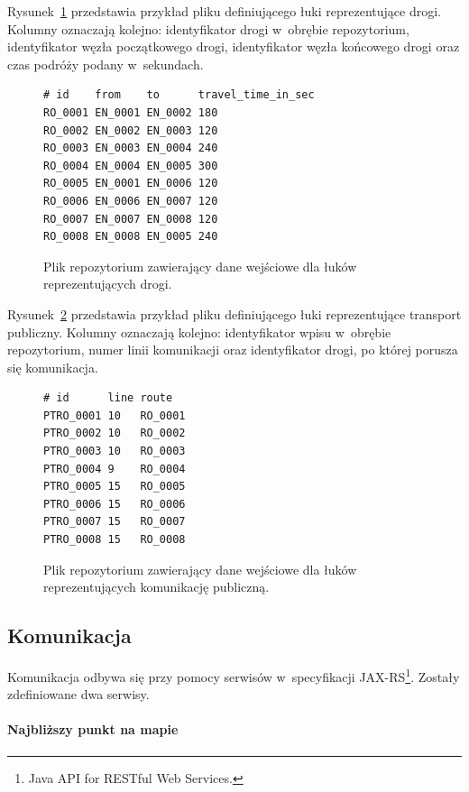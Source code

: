 \documentclass[a4paper,12pt]{article}
\begin{document}
	Rysunek~\ref{vrb:routes_repository} przedstawia przykład pliku definiującego łuki reprezentujące drogi. Kolumny oznaczają kolejno: identyfikator drogi w~obrębie repozytorium, identyfikator węzła początkowego drogi, identyfikator węzła końcowego drogi oraz czas podróży podany w~sekundach.

	\begin{figure}[ht!]
		\centering
		\begin{BVerbatim}
# id    from    to      travel_time_in_sec
RO_0001 EN_0001 EN_0002 180
RO_0002 EN_0002 EN_0003 120
RO_0003 EN_0003 EN_0004 240
RO_0004 EN_0004 EN_0005 300
RO_0005 EN_0001 EN_0006 120
RO_0006 EN_0006 EN_0007 120
RO_0007 EN_0007 EN_0008 120
RO_0008 EN_0008 EN_0005 240
		\end{BVerbatim}
		\caption{Plik repozytorium zawierający dane wejściowe dla łuków reprezentujących drogi.}
		\label{vrb:routes_repository}
	\end{figure}

	Rysunek~\ref{vrb:ptroutes_repository} przedstawia przykład pliku definiującego łuki reprezentujące transport publiczny. Kolumny oznaczają kolejno: identyfikator wpisu w~obrębie repozytorium, numer linii komunikacji oraz identyfikator drogi, po której porusza się komunikacja.

	\begin{figure}[ht!]
		\centering
		\begin{BVerbatim}
# id      line route
PTRO_0001 10   RO_0001
PTRO_0002 10   RO_0002
PTRO_0003 10   RO_0003
PTRO_0004 9    RO_0004
PTRO_0005 15   RO_0005
PTRO_0006 15   RO_0006
PTRO_0007 15   RO_0007
PTRO_0008 15   RO_0008
		\end{BVerbatim}
		\caption{Plik repozytorium zawierający dane wejściowe dla łuków reprezentujących komunikację publiczną.}
		\label{vrb:ptroutes_repository}
	\end{figure}	

	\subsection*{Komunikacja}

	Komunikacja odbywa się przy pomocy serwisów w~specyfikacji JAX-RS\footnote{Java API for RESTful Web Services.}. Zostały zdefiniowane dwa serwisy.

	\paragraph{Najbliższy punkt na mapie}
\end{document}
